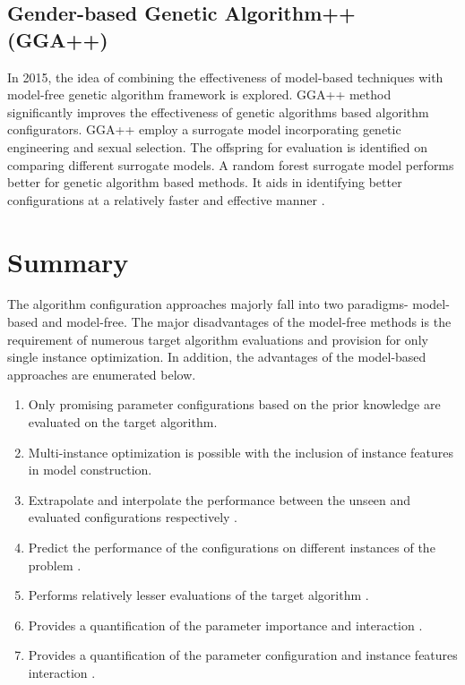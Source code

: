 \subsection{Gender-based Genetic Algorithm++ (GGA++)}

In 2015, the idea of combining the effectiveness of model-based techniques with model-free genetic algorithm framework is explored. GGA++ method significantly \cite{Modelbased_GGA} improves the effectiveness of genetic algorithms based algorithm configurators. GGA++ employ a surrogate model incorporating genetic engineering and sexual selection. The offspring for evaluation is identified on comparing different surrogate models. A random forest surrogate model performs better for genetic algorithm based methods. It aids in identifying better configurations at a relatively faster and effective manner \cite{RF_for_IF} \cite{Modelbased_GGA}.

\section{Summary}

The algorithm configuration approaches majorly fall into two paradigms- model-based and model-free. The major disadvantages of the model-free methods is the requirement of numerous target algorithm evaluations and provision for only single instance optimization. In addition, the advantages of the model-based approaches are enumerated below.
\begin{enumerate}
\item Only promising parameter configurations based on the prior knowledge are evaluated on the target algorithm. 
\item Multi-instance optimization is possible with the inclusion of instance features in model construction.
\item Extrapolate and interpolate the performance between the unseen and evaluated configurations respectively \cite{Hutterphd}.
\item Predict the performance of the configurations on different instances of the problem \cite{Hutterphd}.
\item Performs relatively lesser evaluations of the target algorithm \cite{Hutterphd}.
\item Provides a quantification of the parameter importance and interaction \cite{Hutterphd}.
\item Provides a quantification of the parameter configuration and instance features interaction \cite{Hutterphd}.
\end{enumerate}

